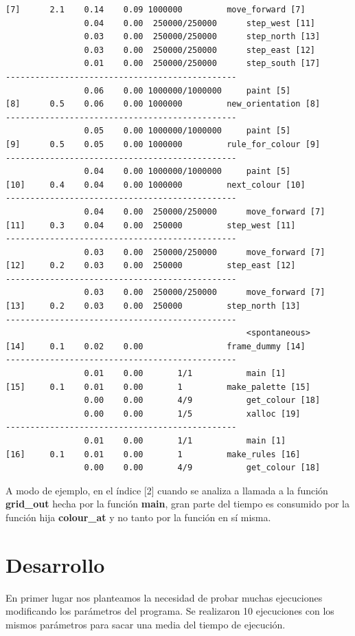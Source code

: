\documentclass[a4paper, 10pt, twoside, notitlepage]{article}
\begin{document}
\begin{verbatim}
[7]      2.1    0.14    0.09 1000000         move_forward [7]
                0.04    0.00  250000/250000      step_west [11]
                0.03    0.00  250000/250000      step_north [13]
                0.03    0.00  250000/250000      step_east [12]
                0.01    0.00  250000/250000      step_south [17]
-----------------------------------------------
                0.06    0.00 1000000/1000000     paint [5]
[8]      0.5    0.06    0.00 1000000         new_orientation [8]
-----------------------------------------------
                0.05    0.00 1000000/1000000     paint [5]
[9]      0.5    0.05    0.00 1000000         rule_for_colour [9]
-----------------------------------------------
                0.04    0.00 1000000/1000000     paint [5]
[10]     0.4    0.04    0.00 1000000         next_colour [10]
-----------------------------------------------
                0.04    0.00  250000/250000      move_forward [7]
[11]     0.3    0.04    0.00  250000         step_west [11]
-----------------------------------------------
                0.03    0.00  250000/250000      move_forward [7]
[12]     0.2    0.03    0.00  250000         step_east [12]
-----------------------------------------------
                0.03    0.00  250000/250000      move_forward [7]
[13]     0.2    0.03    0.00  250000         step_north [13]
-----------------------------------------------
                                                 <spontaneous>
[14]     0.1    0.02    0.00                 frame_dummy [14]
-----------------------------------------------
                0.01    0.00       1/1           main [1]
[15]     0.1    0.01    0.00       1         make_palette [15]
                0.00    0.00       4/9           get_colour [18]
                0.00    0.00       1/5           xalloc [19]
-----------------------------------------------
                0.01    0.00       1/1           main [1]
[16]     0.1    0.01    0.00       1         make_rules [16]
                0.00    0.00       4/9           get_colour [18]

\end{verbatim}
\normalsize
 A modo de ejemplo, en el índice [2] cuando se analiza a llamada a la función \textbf{grid\_out} hecha por la función \textbf{main}, gran parte del tiempo es consumido por la función hija \textbf{colour\_at} y no tanto por la función en sí misma.

\newpage
\section{Desarrollo}
En primer lugar nos planteamos la necesidad de probar muchas ejecuciones modificando los parámetros del programa. Se realizaron 10 ejecuciones con los mismos parámetros para sacar una media del tiempo de ejecución.
\end{document}
